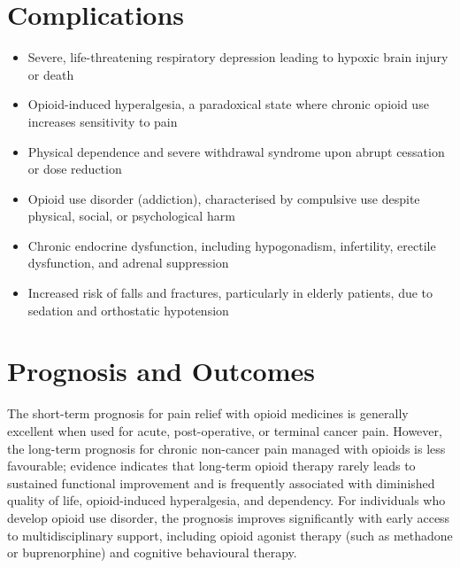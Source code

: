 \section*{Complications}
\begin{itemize}
    \item Severe, life-threatening respiratory depression leading to hypoxic brain injury or death
    \item Opioid-induced hyperalgesia, a paradoxical state where chronic opioid use increases sensitivity to pain
    \item Physical dependence and severe withdrawal syndrome upon abrupt cessation or dose reduction
    \item Opioid use disorder (addiction), characterised by compulsive use despite physical, social, or psychological harm
    \item Chronic endocrine dysfunction, including hypogonadism, infertility, erectile dysfunction, and adrenal suppression
    \item Increased risk of falls and fractures, particularly in elderly patients, due to sedation and orthostatic hypotension
\end{itemize}

\section*{Prognosis and Outcomes}
The short-term prognosis for pain relief with opioid medicines is generally excellent when used for acute, post-operative, or terminal cancer pain. However, the long-term prognosis for chronic non-cancer pain managed with opioids is less favourable; evidence indicates that long-term opioid therapy rarely leads to sustained functional improvement and is frequently associated with diminished quality of life, opioid-induced hyperalgesia, and dependency. For individuals who develop opioid use disorder, the prognosis improves significantly with early access to multidisciplinary support, including opioid agonist therapy (such as methadone or buprenorphine) and cognitive behavioural therapy.

